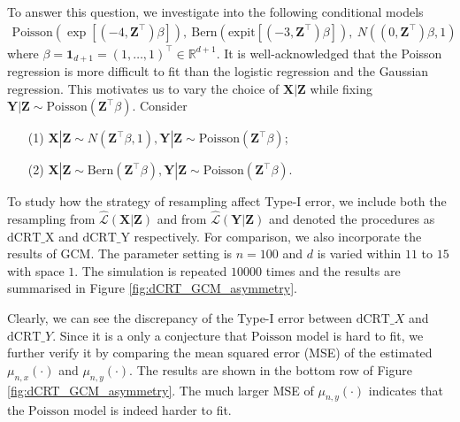 \documentclass{article}
\begin{document}
To answer this question, we investigate into the following conditional models 
\begin{align*}
    \text{Poisson}(\exp[(-4,\bm Z^\top) \beta]),\ \text{Bern}(\text{expit}[(-3, \bm Z^\top)\beta]),\ N((0,\bm Z^\top)\beta,1)
\end{align*}
where $ \beta=\bm 1_{d+1}=(1,\ldots,1)^\top\in\mathbb{R}^{d+1}$. It is well-acknowledged that the Poisson regression is more 
difficult to fit than the logistic regression and the Gaussian regression. This motivates us to vary the choice of $\bm X|\bm Z$ 
while fixing $\bm Y|\bm Z\sim \text{Poisson}(\bm Z^\top\beta)$. Consider 
\begin{enumerate}
    \item[(1)]$\bm X|\bm Z\sim N(\bm Z^\top\beta,1),\bm Y|\bm Z\sim \text{Poisson}(\bm Z^\top\beta)$;
    \item[(2)]$\bm X|\bm Z\sim \text{Bern}(\bm Z^\top\beta),\bm Y|\bm Z\sim \text{Poisson}(\bm Z^\top\beta)$.
\end{enumerate}
To study how the strategy of resampling affect Type-I error, we include both the resampling from $\hat{\mathcal{L}}(\bm X|\bm Z)$ and 
from $\hat{\mathcal{L}}(\bm Y|\bm Z)$ and denoted the procedures as $\mathrm{dCRT}\_\text{X}$ and $\mathrm{dCRT}\_\text{Y}$ respectively. 
For comparison, we also incorporate the results of $\mathrm{GCM}$. The parameter setting is $n=100$ and $d$ is varied within $11$ to $15$ 
with space $1$. The simulation is repeated $10000$ times and the results are summarised in Figure \ref{fig:dCRT_GCM_asymmetry}. 

Clearly, we can see the discrepancy of the Type-I error between $\mathrm{dCRT}\_X$ and $\mathrm{dCRT}\_Y$. Since it is a only a conjecture 
that $\mathrm{Poisson}$ model is hard to fit, we further verify it by comparing the mean squared error (MSE) of the estimated $\mu_{n,x}(\cdot)$ 
and $\mu_{n,y}(\cdot)$. The results are shown in the bottom row of Figure \ref{fig:dCRT_GCM_asymmetry}. The much larger MSE of $\mu_{n,y}(\cdot)$
indicates that the $\mathrm{Poisson}$ model is indeed harder to fit. 
\end{document}
